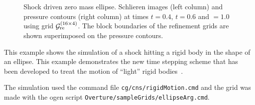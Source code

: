 {\begin{figure}[htb]
\begin{center}
\end{center}
  \caption{Shock driven zero mass ellipse. Schlieren images (left column) and pressure contours (right column)
 at times $t=0.4$, $t=0.6$ and $=1.0$ using grid ${\mathcal G}_{\rm re}^{(16\times 4)}$. The block boundaries of the refinement
   grids are shown superimposed on the pressure contours.}%
  \label{fig:shockDrivenEllipse}
\end{figure}
}


This example shows the simulation of a shock hitting a rigid body in the shape of an ellipse.
This example demonstrates the new time stepping scheme that has been developed
to treat the motion of ``light'' rigid bodies~\cite{lrb2012}.

The simulation used the command file {\tt cg/cns/rigidMotion.cmd}
and the grid was made with the ogen script {\tt Overture/sampleGrids/ellipseArg.cmd}. 